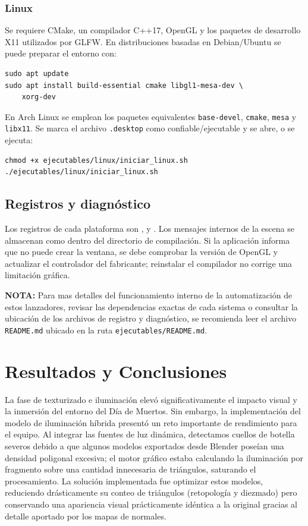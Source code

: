 \documentclass[letter,11pt]{article}
\begin{document}
	\subsubsection{Linux}
	Se requiere CMake, un compilador C++17, OpenGL y los paquetes de desarrollo X11 utilizados por GLFW. En distribuciones basadas en Debian/Ubuntu se puede preparar el entorno con:
	\begin{lstlisting}[style=bashstyle,numbers=none]
sudo apt update
sudo apt install build-essential cmake libgl1-mesa-dev \
    xorg-dev
	\end{lstlisting}
	En Arch Linux se emplean los paquetes equivalentes \texttt{base-devel}, \texttt{cmake}, \texttt{mesa} y \texttt{libx11}. Se marca el archivo \texttt{.desktop} como confiable/ejecutable y se abre, o se ejecuta:
	\begin{lstlisting}[style=bashstyle,numbers=none]
chmod +x ejecutables/linux/iniciar_linux.sh
./ejecutables/linux/iniciar_linux.sh
	\end{lstlisting}

	\subsection{Registros y diagnóstico}
	Los registros de cada plataforma son ,  y . Los mensajes internos de la escena se almacenan como  dentro del directorio de compilación. Si la aplicación informa que no puede crear la ventana, se debe comprobar la versión de OpenGL y actualizar el controlador del fabricante; reinstalar el compilador no corrige una limitación gráfica.
	
	\vspace{0.4cm}
	\textbf{NOTA:} Para mas detalles del funcionamiento interno de la automatización de estos lanzadores, revisar las dependencias exactas de cada sistema o consultar la ubicación de los archivos de registro y diagnóstico, se recomienda leer el archivo \texttt{README.md} ubicado en la ruta \texttt{ejecutables/README.md}.
	
	\section{Resultados y Conclusiones}
	La fase de texturizado e iluminación elevó significativamente el impacto visual y la inmersión del entorno del Día de Muertos. Sin embargo, la implementación del modelo de iluminación híbrida presentó un reto importante de rendimiento para el equipo. Al integrar las fuentes de luz dinámica, detectamos cuellos de botella severos debido a que algunos modelos exportados desde Blender poseían una densidad poligonal excesiva; el motor gráfico estaba calculando la iluminación por fragmento sobre una cantidad innecesaria de triángulos, saturando el procesamiento. La solución implementada fue optimizar estos modelos, reduciendo drásticamente su conteo de triángulos (retopología y diezmado) pero conservando una apariencia visual prácticamente idéntica a la original gracias al detalle aportado por los mapas de normales.
	
\end{document}
